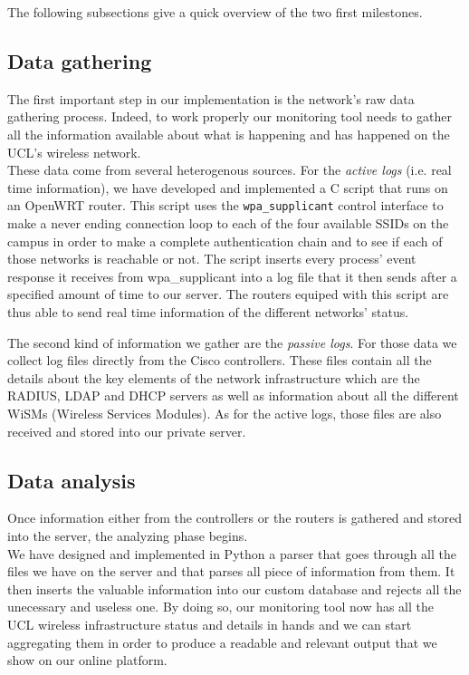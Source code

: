 The following subsections give a quick overview of the two first milestones.


\subsection{Data gathering}
The first important step in our implementation is the network's raw data gathering process. Indeed, to work properly our monitoring tool needs to gather all the information available about what is happening and has happened on the UCL's wireless network.\\
These data come from several heterogenous sources. For the \textit{active logs} (i.e. real time information), we have developed and implemented a C script that runs on an OpenWRT router. This script uses the \texttt{wpa\_supplicant} control interface to make a never ending connection loop to each of the four available SSIDs on the campus in order to make a complete authentication chain and to see if each of those networks is reachable or not. The script inserts every process' event response it receives from wpa\_supplicant into a log file that it then sends after a specified amount of time to our server. The routers equiped with this script are thus able to send real time information of the different networks' status.

The second kind of information we gather are the \textit{passive logs}. For those data we collect log files directly from the Cisco controllers. These files contain all the details about the key elements of the network infrastructure which are the RADIUS, LDAP and DHCP servers as well as information about all the different WiSMs (Wireless Services Modules). As for the active logs, those files are also received and stored into our private server.



\subsection{Data analysis}
Once information either from the controllers or the routers is gathered and stored into the server, the analyzing phase begins.\\
We have designed and implemented in Python a parser that goes through all the files we have on the server and that parses all piece of information from them. It then inserts the valuable information into our custom database and rejects all the unecessary and useless one. By doing so, our monitoring tool now has all the UCL wireless infrastructure status and details in hands and we can start aggregating them in order to produce a readable and relevant output that we show on our online platform.\\


